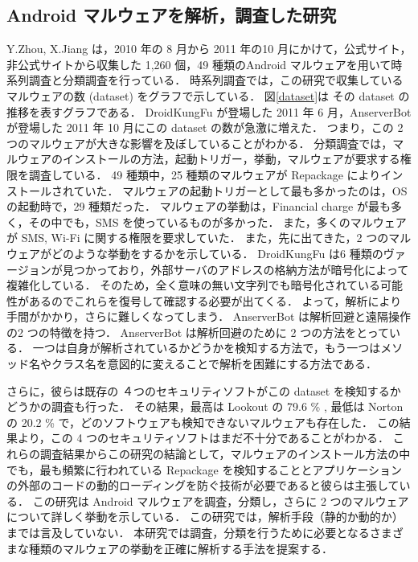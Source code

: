 \subsection{Android マルウェアを解析，調査した研究}
\label{researches}
Y.Zhou, X.Jiang は，2010 年の 8 月から 2011 年の10 月にかけて，公式サイト，非公式サイトから収集した 1,260 個，49 種類のAndroid マルウェアを用いて時系列調査と分類調査を行っている\cite{dissect}．
時系列調査では，この研究で収集しているマルウェアの数 (dataset) をグラフで示している．
図\ref{dataset}は その dataset の推移を表すグラフである．
DroidKungFu が登場した 2011 年 6 月，AnserverBot が登場した 2011 年 10 月にこの dataset の数が急激に増えた．
つまり，この 2 つのマルウェアが大きな影響を及ぼしていることがわかる．
分類調査では，マルウェアのインストールの方法，起動トリガー，挙動，マルウェアが要求する権限を調査している．
49 種類中，25 種類のマルウェアが Repackage によりインストールされていた．
マルウェアの起動トリガーとして最も多かったのは，OS の起動時で，29 種類だった．
マルウェアの挙動は，Financial charge が最も多く，その中でも，SMS を使っているものが多かった．
また，多くのマルウェアが SMS, Wi-Fi に関する権限を要求していた．
また，先に出てきた，2 つのマルウェアがどのような挙動をするかを示している．
DroidKungFu は6 種類のヴァージョンが見つかっており，外部サーバのアドレスの格納方法が暗号化によって複雑化している．
そのため，全く意味の無い文字列でも暗号化されている可能性があるのでこれらを復号して確認する必要が出てくる．
よって，解析により手間がかかり，さらに難しくなってしまう．
AnserverBot は解析回避と遠隔操作の2 つの特徴を持つ．
AnserverBot は解析回避のために 2 つの方法をとっている．
一つは自身が解析されているかどうかを検知する方法で，もう一つはメソッド名やクラス名を意図的に変えることで解析を困難にする方法である．

さらに，彼らは既存の ４つのセキュリティソフトがこの  dataset を検知するかどうかの調査も行った．
その結果，最高は Lookout の 79.6 \% , 最低は Norton の 20.2 \% で，どのソフトウェアも検知できないマルウェアも存在した．
この結果より，この 4 つのセキュリティソフトはまだ不十分であることがわかる．
これらの調査結果からこの研究の結論として，マルウェアのインストール方法の中でも，最も頻繁に行われている Repackage を検知することとアプリケーションの外部のコードの動的ローディングを防ぐ技術が必要であると彼らは主張している．
この研究は Android マルウェアを調査，分類し，さらに 2 つのマルウェアについて詳しく挙動を示している．
この研究では，解析手段（静的か動的か）までは言及していない．
本研究では調査，分類を行うために必要となるさまざまな種類のマルウェアの挙動を正確に解析する手法を提案する．

